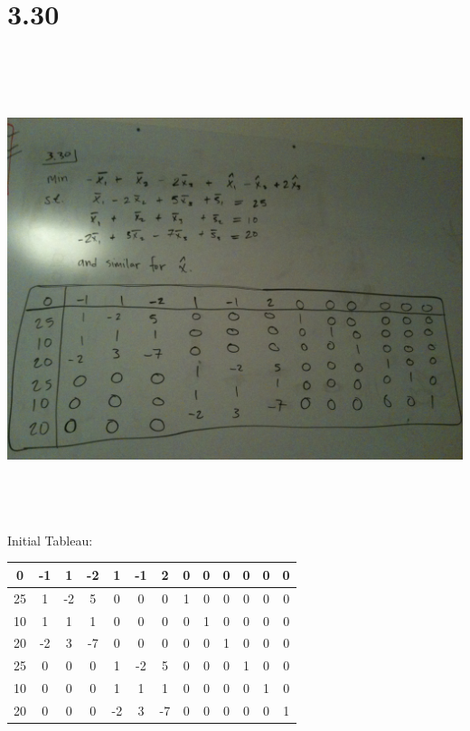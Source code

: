 \documentclass[a4paper,12pt]{article}
\begin{document}
\section*{3.30}
\includegraphics[width=14cm, height=14cm, keepaspectratio=true]{image/3_30.jpg}
Initial Tableau:
\begin{center}
\begin{tabular}{| c | c  c  c  c  c  c  c  c  c  c  c  c |}
\hline
0 & -1 & 1 & -2 & 1 & -1 & 2 & 0 & 0 & 0 & 0 & 0 & 0\\
\hline
25 & 1 & -2 & 5 & 0 & 0 & 0 & 1 & 0 & 0 & 0 & 0 & 0\\
10 & 1 & 1 & 1 & 0 & 0 & 0 & 0 & 1 & 0 & 0 & 0 & 0\\
20 & -2 & 3 & -7 & 0 & 0 & 0 & 0 & 0 & 1 & 0 & 0 & 0\\
25 & 0 & 0 & 0 & 1 & -2 & 5 & 0 & 0 & 0 & 1 & 0 & 0\\
10 & 0 & 0 & 0 & 1 & 1 & 1 & 0 & 0 & 0 & 0 & 1 & 0\\
20 & 0 & 0 & 0 & -2 & 3 & -7 & 0 & 0 & 0 & 0 & 0 & 1\\
\hline
\end{tabular}
\end{center}
\end{document}
